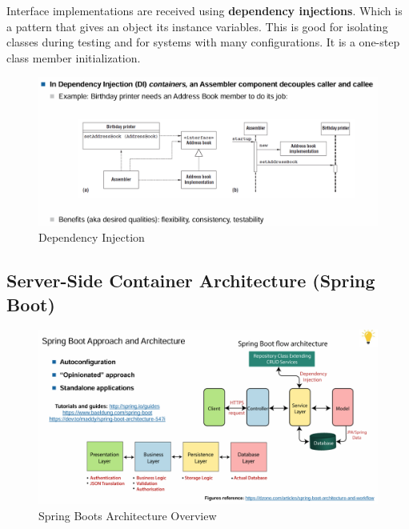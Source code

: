 \documentclass[../Main.tex]{subfiles}
\begin{document}
Interface implementations are received using \textbf{dependency injections}.
Which is a pattern that gives an object its instance variables.
This is good for isolating classes during testing and for systems
with many configurations. It is a one-step class member initialization.

\begin{figure}[H]
    \centering
    \includegraphics[width=1\linewidth]{Images/dep-injection.png}
    \caption{Dependency Injection}
\end{figure}

\subsection{Server-Side Container Architecture (Spring Boot)}

\begin{figure}[H]
    \centering
    \includegraphics[width=1\linewidth]{Images/spring-boot-arch.png}
    \caption{Spring Boots Architecture Overview}
\end{figure}
\end{document}
